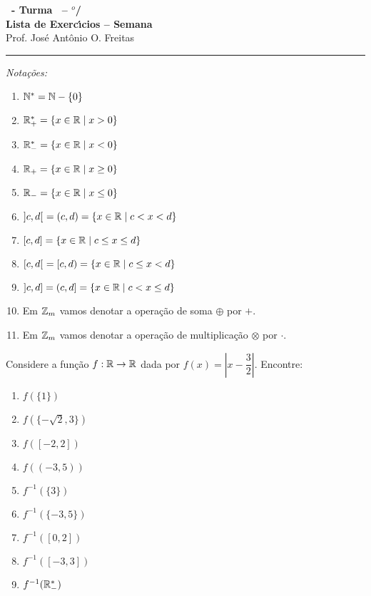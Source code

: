 \documentclass[12pt]{exam}
\begin{document}
    \begin{center}
    {\Large\bf \disciplina\ - Turma \turma\ -- \semestre$^{o}$/\ano} \\ \vspace{9pt} {\large\bf
        Lista de Exerc{\'\i}cios -- Semana \numerosemana}\\ \vspace{9pt} Prof. Jos{\'e} Ant{\^o}nio O. Freitas
    \end{center}
    \hrule

    \vspace{.6cm}

    \begin{center}
    \textit{Nota\c{c}\~oes:}
\end{center}
\begin{multicols}{2}
    \begin{enumerate}[label={\roman*})]
        \item $\mathbb{N}^* = \mathbb{N} - \{0\}$
        \item $\mathbb{R}^*_+ = \{x \in \mathbb{R} \mid x > 0\}$
        \item $\mathbb{R}^*_- = \{x \in \mathbb{R} \mid x < 0\}$
        \item $\mathbb{R}_+ = \{x \in \mathbb{R} \mid x \ge 0\}$
        \item $\mathbb{R}_- = \{x \in \mathbb{R} \mid x \le 0\}$
        \item $]c,d[\ = (c,d) = \{x \in \mathbb{R} \mid c < x < d\}$
        \item $[c,d] = \{x \in \mathbb{R} \mid c \le x \le d\}$
        \item $[c,d[\ = [c, d) = \{x \in \mathbb{R} \mid c \le x < d\}$
        \item $]c,d] = (c, d] = \{x \in \mathbb{R} \mid c < x \le d\}$
        \item Em $\mathbb{Z}_m$ vamos denotar a opera\c{c}\~ao de soma $\oplus$ por $+$.
        \item Em $\mathbb{Z}_m$ vamos denotar a opera\c{c}\~ao de multiplica\c{c}\~ao $\otimes$ por $\cdot$.
    \end{enumerate}
\end{multicols}

\vspace{.6cm}

\questao{} Considere a fun\c{c}\~ao $f : \mathbb{R} \to \mathbb{R}$ dada por $f(x) = \left| x - \dfrac{3}{2}\right|$. Encontre:
\begin{multicols}{3}
    \begin{enumerate}[label={\alph*})]
        \item $f(\{1\})$
        \item $f(\{-\sqrt{2}, 3\})$
        \item $f([-2,2])$
        \item $f((-3,5))$
        \item $f^{-1}(\{3\})$
        \item $f^{-1}(\{-3,5\})$
        \item $f^{-1}([0,2])$
        \item $f^{-1}([-3,3])$
        \item $f^{-1}(\mathbb{R}^*_-)$
    \end{enumerate}
\end{multicols}
\end{document}
